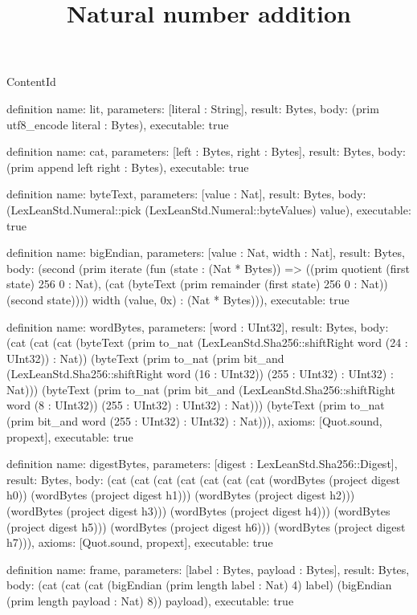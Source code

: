 \begin{lexlean}{ContentId}
\title{Natural number addition}
\begin{semanticmodule}
definition{
  name: lit,
  parameters: [literal : String],
  result: Bytes,
  body: (prim utf8_encode literal : Bytes),
  executable: true
}

definition{
  name: cat,
  parameters: [left : Bytes, right : Bytes],
  result: Bytes,
  body: (prim append left right : Bytes),
  executable: true
}

definition{
  name: byteText,
  parameters: [value : Nat],
  result: Bytes,
  body: (LexLeanStd.Numeral::pick (LexLeanStd.Numeral::byteValues) value),
  executable: true
}

definition{
  name: bigEndian,
  parameters: [value : Nat, width : Nat],
  result: Bytes,
  body: (second (prim iterate (fun (state : (Nat * Bytes)) => ((prim quotient (first state) 256 0 : Nat), (cat (byteText (prim remainder (first state) 256 0 : Nat)) (second state)))) width (value, 0x) : (Nat * Bytes))),
  executable: true
}

definition{
  name: wordBytes,
  parameters: [word : UInt32],
  result: Bytes,
  body: (cat (cat (cat (byteText (prim to_nat (LexLeanStd.Sha256::shiftRight word (24 : UInt32)) : Nat)) (byteText (prim to_nat (prim bit_and (LexLeanStd.Sha256::shiftRight word (16 : UInt32)) (255 : UInt32) : UInt32) : Nat))) (byteText (prim to_nat (prim bit_and (LexLeanStd.Sha256::shiftRight word (8 : UInt32)) (255 : UInt32) : UInt32) : Nat))) (byteText (prim to_nat (prim bit_and word (255 : UInt32) : UInt32) : Nat))),
  axioms: [Quot.sound, propext],
  executable: true
}

definition{
  name: digestBytes,
  parameters: [digest : LexLeanStd.Sha256::Digest],
  result: Bytes,
  body: (cat (cat (cat (cat (cat (cat (cat (wordBytes (project digest h0)) (wordBytes (project digest h1))) (wordBytes (project digest h2))) (wordBytes (project digest h3))) (wordBytes (project digest h4))) (wordBytes (project digest h5))) (wordBytes (project digest h6))) (wordBytes (project digest h7))),
  axioms: [Quot.sound, propext],
  executable: true
}

definition{
  name: frame,
  parameters: [label : Bytes, payload : Bytes],
  result: Bytes,
  body: (cat (cat (cat (bigEndian (prim length label : Nat) 4) label) (bigEndian (prim length payload : Nat) 8)) payload),
  executable: true
}


\end{semanticmodule}
\end{lexlean}
